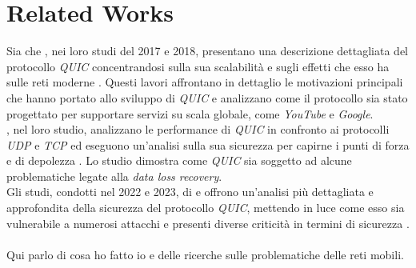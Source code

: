 \chapter{Related Works}
\label{cap:RelatedWorks}

Sia  che  , nei loro studi del 2017 e 2018, presentano una descrizione dettagliata
del protocollo \emph{QUIC} concentrandosi sulla sua scalabilità e sugli effetti che esso ha sulle reti moderne \cite{article:handshake,article:wild}.
Questi lavori affrontano in dettaglio le motivazioni principali che hanno portato allo sviluppo di \emph{QUIC} e analizzano come il protocollo sia stato progettato per 
supportare servizi su scala globale, come \emph{YouTube} e \emph{Google}. \\
, nel loro studio, analizzano le performance di \emph{QUIC} in confronto ai protocolli \emph{UDP} e \emph{TCP} ed eseguono un'analisi sulla sua sicurezza 
per capirne i punti di forza e di depolezza \cite{article:securityAnaP}. Lo studio dimostra come \emph{QUIC} sia soggetto ad alcune problematiche legate alla \emph{data loss recovery}.
\\
Gli studi, condotti nel 2022 e 2023, di \citeauthor{article:QuicAtt} e  offrono un'analisi più dettagliata e approfondita
della sicurezza del protocollo \emph{QUIC}, mettendo in luce come esso sia vulnerabile a numerosi attacchi e presenti diverse criticità in termini di sicurezza \cite{article:QuicAtt,article:forge}.
\\\\
Qui parlo di cosa ho fatto io e delle ricerche sulle problematiche delle reti mobili. 